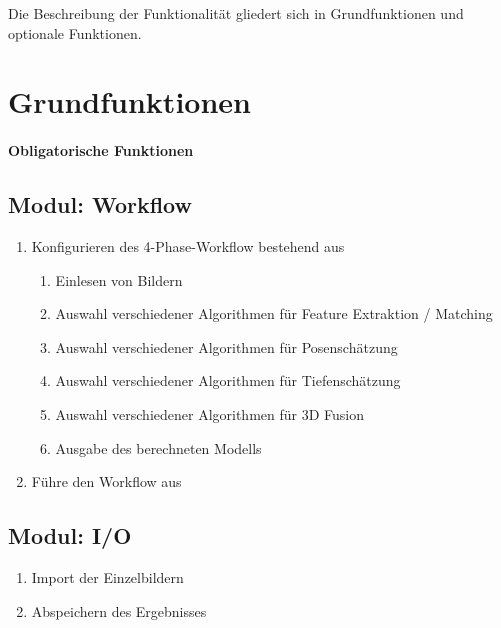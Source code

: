 
Die Beschreibung der Funktionalität gliedert sich in Grundfunktionen und optionale Funktionen.

\section{Grundfunktionen}
	\paragraph{Obligatorische Funktionen}
	\subsection{Modul: Workflow}
	\begin{enumerate}[ align=left, label={\textbf{\textbackslash 	FM1\arabic*0\textbackslash}} ]
		\item Konfigurieren des 4-Phase-Workflow bestehend aus
		\begin{enumerate}[  align=left, label={\textbf{\textbackslash FM11\arabic*\textbackslash}} ]
			\item Einlesen von Bildern
			\item Auswahl verschiedener Algorithmen für Feature Extraktion / Matching
			\item Auswahl verschiedener Algorithmen für Posenschätzung
			\item Auswahl verschiedener Algorithmen für Tiefenschätzung
			\item Auswahl verschiedener Algorithmen für 3D Fusion
			\item Ausgabe des berechneten Modells
		\end{enumerate}
		\item Führe den Workflow aus
	\end{enumerate}

	\subsection{Modul: I/O}
		\begin{enumerate}[ align=left, label={\textbf{\textbackslash FM2\arabic*0\textbackslash}} ]
			\item Import der Einzelbildern
			\item Abspeichern des Ergebnisses
		\end{enumerate}

